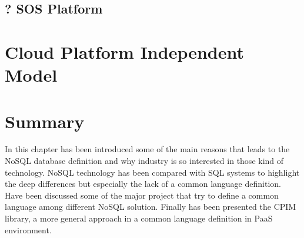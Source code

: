 \subsection{? SOS Platform}

\section{Cloud Platform Independent Model}

\section{Summary}
In this chapter has been introduced some of the main reasons that leads to the NoSQL database definition and why industry is so interested in those kind of technology. 
\noindent NoSQL technology has been compared with SQL systems to highlight the deep differences but especially the lack of a common language definition. Have been discussed some of the major project that try to define a common language among different NoSQL solution.
\noindent Finally has been presented the CPIM library, a more general approach in a common language definition in PaaS environment.